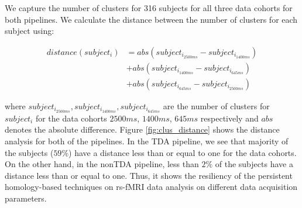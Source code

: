 We capture the number of clusters for 316 subjects for all three data cohorts for both pipelines. We calculate the distance between the number of clusters for each subject using: 

\begin{align}
    distance(subject_i) &= abs(subject_{i_{2500ms}} - subject_{i_{1400ms}})   \nonumber\\
    &+ abs(subject_{i_{1400ms}} - subject_{i_{645ms}})   \nonumber \\ 
    &+ abs(subject_{i_{645ms}} - subject_{i_{2500ms}}) \label{eq:dis}
\end{align}

where $subject_{i_{2500ms}}, subject_{i_{1400ms}}, subject_{i_{645ms}}$ are the number of clusters for $subject_i$ for the data cohorts $2500ms$, $1400ms$, $645ms$ respectively and $abs$ denotes the absolute difference. 
Figure \ref{fig:clus_distance} shows the distance analysis for both of the pipelines. In the TDA pipeline, we see that majority of the subjects ($59\%$) have a distance less than or equal to one for the data cohorts. On the other hand, in the nonTDA pipeline, less than $2\%$ of the subjects have a distance less than or equal to one. Thus, it shows the resiliency of the persistent homology-based techniques on rs-fMRI data analysis on different data acquisition parameters.




